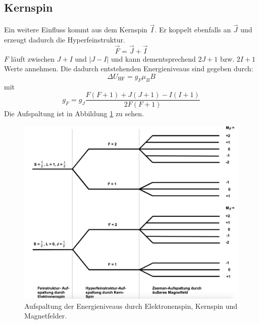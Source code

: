\subsection{Kernspin}
Ein weitere Einfluss kommt aus dem Kernspin $\vec{I}$. Er koppelt ebenfalls an $\vec{J}$ und erzeugt dadurch die Hyperfeinstruktur.
\begin{equation}
	\vec{F}=\vec{J} +\vec{I}
\end{equation}
$F$ läuft zwischen $J+I$ und $|J-I|$ und kann dementsprechend $2J+1$ bzw. $2I+1$ Werte annehmen. Die dadurch entstehenden Energieniveaus sind gegeben durch:
\begin{equation}
	\Delta U_\mathrm{HF}=g_F\mu_BB
	\label{eqn:zeemann}
\end{equation}
mit
\begin{equation}
	g_F=g_J\frac{F(F+1)+J(J+1)-I(I+1)}{2F(F+1)}
	\label{eqn:g_F}
\end{equation}
Die Aufspaltung ist in Abbildung \ref{fig:zeemann} zu sehen.
\begin{figure}
	\centering
	\includegraphics[width=0.8\linewidth]{img/zeemann.jpg}
	\caption{Aufspaltung der Energieniveaus durch Elektronenspin, Kernspin und Magnetfelder.\cite{V21}}
	\label{fig:zeemann}
\end{figure}
